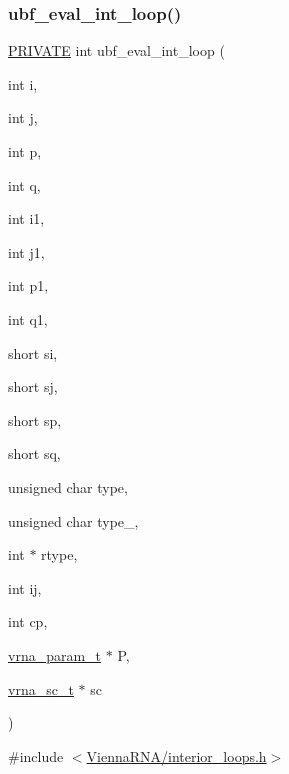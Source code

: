 \subsubsection{\texorpdfstring{ubf\+\_\+eval\+\_\+int\+\_\+loop()}{ubf\_eval\_int\_loop()}}
{\footnotesize\ttfamily \mbox{\hyperlink{group__utils_ga5e151c615eda34903514212f05a5ccf8}{P\+R\+I\+V\+A\+TE}} int ubf\+\_\+eval\+\_\+int\+\_\+loop (\begin{DoxyParamCaption}\item[{int}]{i,  }\item[{int}]{j,  }\item[{int}]{p,  }\item[{int}]{q,  }\item[{int}]{i1,  }\item[{int}]{j1,  }\item[{int}]{p1,  }\item[{int}]{q1,  }\item[{short}]{si,  }\item[{short}]{sj,  }\item[{short}]{sp,  }\item[{short}]{sq,  }\item[{unsigned char}]{type,  }\item[{unsigned char}]{type\+\_,  }\item[{int $\ast$}]{rtype,  }\item[{int}]{ij,  }\item[{int}]{cp,  }\item[{\mbox{\hyperlink{group__energy__parameters_ga8a69ca7d787e4fd6079914f5343a1f35}{vrna\+\_\+param\+\_\+t}} $\ast$}]{P,  }\item[{\mbox{\hyperlink{group__soft__constraints_ga75401ce219ef8dbcceb672db82d434c6}{vrna\+\_\+sc\+\_\+t}} $\ast$}]{sc }\end{DoxyParamCaption})}



{\ttfamily \#include $<$\mbox{\hyperlink{interior__loops_8h}{Vienna\+R\+N\+A/interior\+\_\+loops.\+h}}$>$}

\mbox{\label{group__loops_gae85ec93c39058ce80d67b64239f64c71}} 
